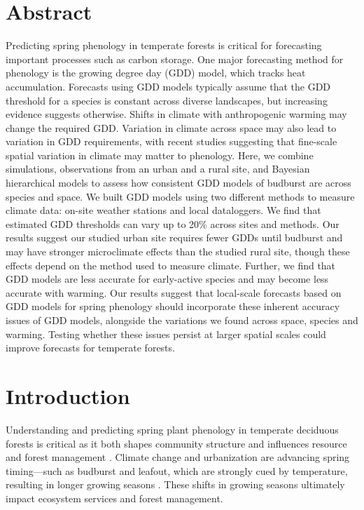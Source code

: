 \documentclass{article}\usepackage[]{graphicx}\usepackage[]{color}
\newcommand{\R}[1]{\label{#1}\linelabel{#1}}
\begin{document}
\section*{Abstract} 
Predicting spring phenology in temperate forests is critical for forecasting important processes such as carbon storage. One major forecasting method for phenology is the growing degree day (GDD) model, which tracks heat accumulation. Forecasts using GDD models typically assume that the GDD threshold for a species is constant across diverse landscapes, but increasing evidence suggests otherwise. Shifts in climate with anthropogenic warming may change the required GDD. Variation in climate across space may also lead to variation in GDD requirements, with recent studies suggesting that fine-scale spatial variation in climate may matter to phenology. Here, we combine simulations, observations from an urban and a rural site, and Bayesian hierarchical models to assess how consistent GDD models of budburst are across species and space. We built GDD models using two different methods to measure climate data: on-site weather stations and local dataloggers. We find that estimated GDD thresholds can vary up to 20\% across sites and methods. Our results suggest our studied urban site requires fewer GDDs until budburst and may have stronger microclimate effects than the studied rural site, though these effects depend on the method used to measure climate. Further, we find that GDD models are less accurate for early-active species and may become less accurate with warming. Our results suggest that local-scale forecasts based on GDD models for spring phenology should incorporate these inherent accuracy issues of GDD models, alongside the variations we found across space, species and warming. Testing whether these issues persist at larger spatial scales could improve forecasts for temperate forests.  

\section{Introduction}

\R{Z3ecosys}Understanding and predicting spring plant phenology in temperate deciduous forests is critical as it both shapes community structure and influences resource and forest management \citep{Morellato2016,Silvestro2019}. Climate change and urbanization are advancing spring timing---such as budburst and leafout, which are strongly cued by temperature, resulting in longer growing seasons \citep{Chuine2001}. These shifts in growing seasons ultimately impact ecosystem services and forest management.\R{Z3ecosysend}
 
\end{document}
